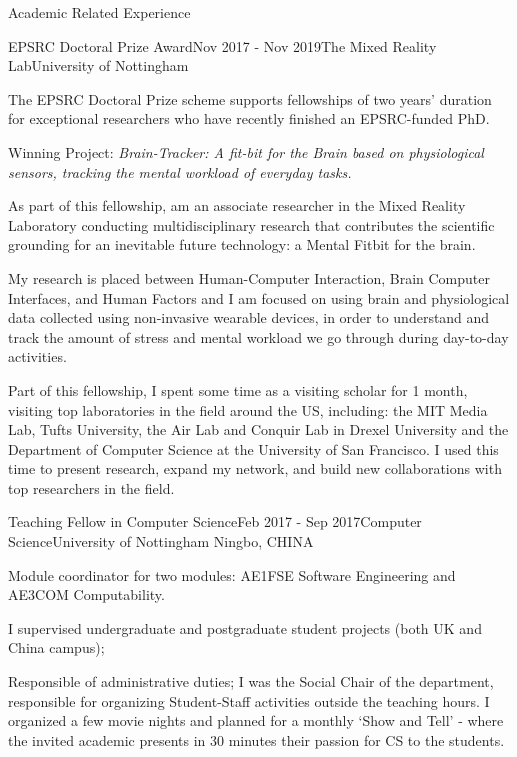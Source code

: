 \documentclass{resume} %
\begin{document}

\begin{rSection}{Academic Related Experience}
	
	\begin{rSubsection}{EPSRC Doctoral Prize Award}{Nov 2017 - Nov 2019}{The Mixed Reality Lab}{University of Nottingham }
		\item The EPSRC Doctoral Prize scheme supports fellowships of two years' duration for exceptional researchers who have recently finished an EPSRC-funded PhD.
		\item Winning Project: \textit{Brain-Tracker: A fit-bit for the Brain based on physiological sensors, tracking the mental workload of everyday tasks.}
		\item As part of this fellowship, am an associate researcher in the Mixed Reality Laboratory conducting multidisciplinary research that contributes the scientific grounding for an inevitable future technology: a Mental Fitbit for the brain. 
		\item My research is placed between Human-Computer Interaction, Brain Computer Interfaces, and Human Factors and I am focused on using brain and physiological data collected using non-invasive wearable devices, in order to understand and track the amount of stress and mental workload we go through during day-to-day activities.
		\item Part of this fellowship, I spent some time as a visiting scholar for 1 month, visiting top laboratories in the field around the US, including: the MIT Media Lab, Tufts University, the Air Lab and Conquir Lab in Drexel University and the Department of Computer Science at the University of San Francisco. I used this time to present research, expand my network, and build new collaborations with top researchers in the field.
	\end{rSubsection}
	
	\begin{rSubsection}{Teaching Fellow in Computer Science}{Feb 2017 - Sep 2017}{Computer Science}{University of Nottingham Ningbo, CHINA}
			\item Module coordinator for two modules: AE1FSE Software Engineering and AE3COM Computability.
			\item I supervised undergraduate and postgraduate student projects (both UK and China campus);
			\item Responsible of administrative duties; I was the Social Chair of the department, responsible for organizing Student-Staff activities outside the teaching hours. I organized a few movie nights and planned for a monthly `Show and Tell' - where the invited academic presents in 30 minutes their passion for CS to the students. 
	\end{rSubsection}
	

\end{rSection}
\end{document}
